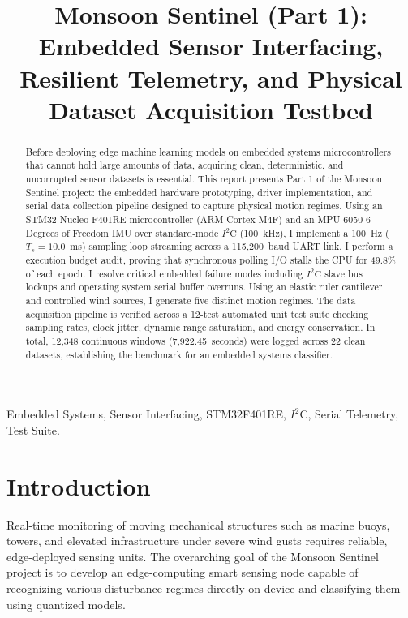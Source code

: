 \documentclass[twocolumn]{article}
\title{Monsoon Sentinel (Part 1): Embedded Sensor Interfacing, Resilient Telemetry, and Physical Dataset Acquisition Testbed}
\begin{document}
\ninept
\maketitle

\begin{abstract}
Before deploying edge machine learning models on embedded systems microcontrollers that cannot hold large amounts of data, acquiring clean, deterministic, and uncorrupted sensor datasets is essential. This report presents Part 1 of the Monsoon Sentinel project: the embedded hardware prototyping, driver implementation, and serial data collection pipeline designed to capture physical motion regimes. Using an STM32 Nucleo-F401RE microcontroller (ARM Cortex-M4F) and an MPU-6050 6-Degrees of Freedom IMU over standard-mode $I^2\text{C}$ (100~kHz), I implement a 100~Hz ($T_s = 10.0$~ms) sampling loop streaming across a 115,200~baud UART link. I perform a execution budget audit, proving that synchronous polling I/O stalls the CPU for 49.8\% of each epoch. I resolve critical embedded failure modes including $I^2\text{C}$ slave bus lockups and operating system serial buffer overruns. Using an elastic ruler cantilever and controlled wind sources, I generate five distinct motion regimes. The data acquisition pipeline is verified across a 12-test automated unit test suite checking sampling rates, clock jitter, dynamic range saturation, and energy conservation. In total, 12,348 continuous windows (7,922.45~seconds) were logged across 22 clean datasets, establishing the benchmark for an embedded systems classifier.
\end{abstract}

\begin{keywords}
Embedded Systems, Sensor Interfacing, STM32F401RE, $I^2\text{C}$, Serial Telemetry, Test Suite.
\end{keywords}

\section{Introduction}
Real-time monitoring of moving mechanical structures such as marine buoys, towers, and elevated infrastructure under severe wind gusts requires reliable, edge-deployed sensing units. The overarching goal of the Monsoon Sentinel project is to develop an edge-computing smart sensing node capable of recognizing various disturbance regimes directly on-device and classifying them using quantized models.
\end{document}

